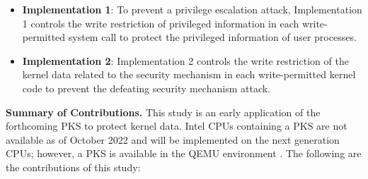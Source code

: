 \begin{itemize}%


\item {\bf Implementation 1}: To prevent a privilege escalation attack,
Implementation 1 controls the write restriction of privileged information in each
write-permitted system call to protect the privileged information of user processes.

\item {\bf Implementation 2}: 
Implementation 2 controls the write restriction of the kernel data related to
the security mechanism in each write-permitted kernel code to prevent the
defeating security mechanism attack.


\end{itemize}


%
{\bf Summary of Contributions.}
This study is an early application of the forthcoming PKS to protect kernel
data.
%
Intel CPUs containing a PKS are not available as of October 2022 and will be
implemented on the next generation CPUs; however, a PKS is available in the QEMU
environment \cite{qemu}.
%
%
The following are the contributions of this study:
%
%
% 

%

